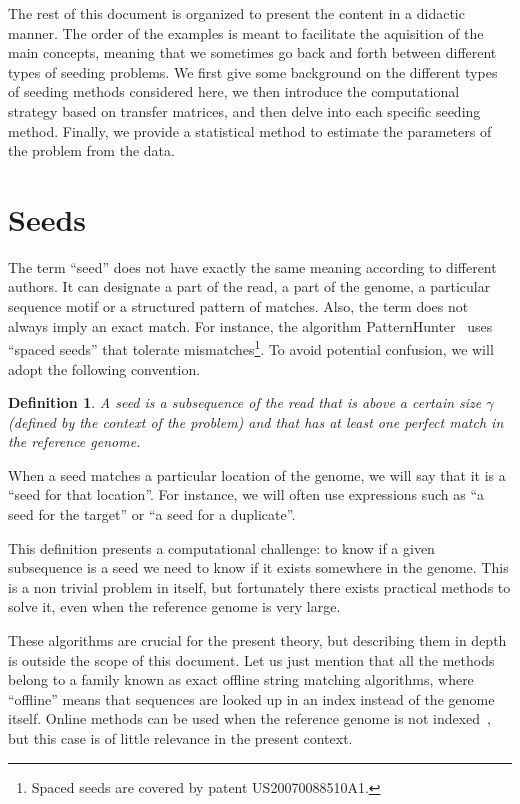 \documentclass{article}
\newtheorem{definition}{Definition}
\begin{document}
The rest of this document is organized to present the content in a
didactic manner. The order of the examples is meant to facilitate the
aquisition of the main concepts, meaning that we sometimes go back and
forth between different types of seeding problems. We first give some
background on the different types of seeding methods considered here, we
then introduce the computational strategy based on transfer matrices, and
then delve into each specific seeding method. Finally, we provide a
statistical method to estimate the parameters of the problem from the
data.

\section{Seeds}

The term ``seed'' does not have exactly the same meaning according to
different authors. It can designate a part of the read, a part of the
genome, a particular sequence motif or a structured pattern of matches.
Also, the term does not always imply an exact match. For instance, the
algorithm PatternHunter~\cite{pmid11934743} uses ``spaced seeds''
that tolerate mismatches\footnote{Spaced seeds are covered
by patent US20070088510A1.}. To avoid potential confusion,
we will adopt the following convention.

\begin{definition}
A seed is a subsequence of the read that is above a certain size $\gamma$
(defined by the context of the problem) and that has at least one perfect
match in the reference genome.
\end{definition}

When a seed matches a particular location of the genome, we will say that
it is a ``seed for that location''. For instance, we will often use
expressions such as ``a seed for the target'' or ``a seed for a
duplicate''.

This definition presents a computational challenge: to know if a given
subsequence is a seed we need to know if it exists somewhere in the
genome. This is a non trivial problem in itself, but fortunately there
exists practical methods to solve it, even when the reference genome is
very large.

These algorithms are crucial for the present theory, but describing them
in depth is outside the scope of this document. Let us just mention that
all the methods belong to a family known as exact offline string matching
algorithms, where ``offline'' means that sequences are looked up in an
index instead of the genome itself. Online methods can be used when the
reference genome is not indexed~\cite{faro2013exact}, but this case is of
little relevance in the present context.
\end{document}
